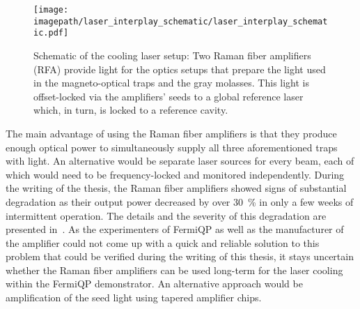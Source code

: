 \begin{figure}
    \centering
    \texttt{[image: \\imagepath/laser\_interplay\_schematic/laser\_interplay\_schematic.pdf]}
    \caption{Schematic of the cooling laser setup: Two Raman fiber amplifiers  (RFA) provide light for the optics setups that prepare the light used in the magneto-optical traps and the gray molasses. This light is offset-locked via the amplifiers' seeds to a global reference laser which, in turn, is locked to a reference cavity.}
    \label{fig:laser_interplay_schematic}
\end{figure}

The main advantage of using the Raman fiber amplifiers is that they produce enough optical power to simultaneously supply all three aforementioned traps with light. An alternative would be separate laser sources for every beam, each of which would need to be frequency-locked and monitored independently. During the writing of the thesis, the Raman fiber amplifiers showed signs of substantial degradation as their output power decreased by over \SI{30}{\percent} in only a few weeks of intermittent operation. The details and the severity of this degradation are presented in~\cite{qesja_design_2022}. As the experimenters of FermiQP as well as the manufacturer of the amplifier could not come up with a quick and reliable solution to this problem that could be verified during the writing of this thesis, it stays uncertain whether the Raman fiber amplifiers can be used long-term for the laser cooling within the FermiQP demonstrator. An alternative approach would be amplification of the seed light using tapered amplifier chips.

